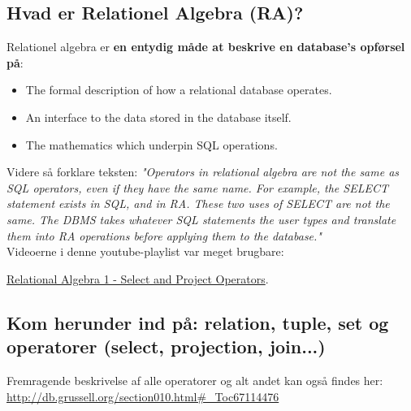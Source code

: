 \newpage

\subsection{Hvad er Relationel Algebra (RA)?}


Relationel algebra er \textbf{en entydig måde at beskrive en database's opførsel på}: 

\begin{itemize}
	\item The formal description of how a relational database operates.
	\item An interface to the data stored in the database itself.
	\item The mathematics which underpin SQL operations.
\end{itemize}

Videre så forklare teksten: \textit{"Operators in relational algebra are not the same as SQL operators, even if they have the same name. For example, the SELECT statement exists in SQL, and in RA. These two uses of SELECT are not the same. The DBMS takes whatever SQL statements the user types and translate them into RA operations before applying them to the database."}\\

Videoerne i denne youtube-playlist var meget brugbare:

\href{https://www.youtube.com/watch?v=yVh_LcOcQdg&list=PL8A52AA7E276200C0&index=1}{Relational Algebra 1 - Select and Project Operators}.

\subsection{Kom herunder ind på: relation, tuple, set og operatorer (select, projection, join...)}

Fremragende beskrivelse af alle operatorer og alt andet kan også findes her: \\
\url{http://db.grussell.org/section010.html#_Toc67114476}

